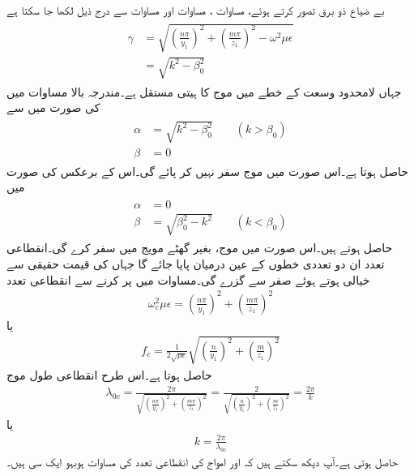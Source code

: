 بے ضیاع ذو برق  تصور کرتے ہوئے، مساوات ،  مساوات  اور مساوات  سے درج ذیل لکھا جا سکتا ہے
\begin{gather}
\begin{aligned}\label{مساوات_مویج_عرضی_مقناطیسی_مستقل_موج}
\gamma&=\sqrt{\left(\frac{n\pi}{y_1}\right)^2+\left(\frac{m\pi}{z_1}\right)^2-\omega^2 \mu \epsilon}\\
&=\sqrt{k^2-\beta_0^2}
\end{aligned}
\end{gather}
جہاں  لامحدود وسعت کے خطے میں موج کا ہیتی مستقل  ہے۔مندرجہ بالا مساوات میں  کی صورت میں  سے
\begin{gather}
\begin{aligned}\label{مساوات_مویج_تضعیفی_مستقل_الف}
\alpha&=\sqrt{k^2-\beta_0^2}  \quad \quad (k>\beta_0)\\
\beta &=0
\end{aligned}
\end{gather}
حاصل ہوتا ہے۔اس صورت میں موج سفر نہیں کر پائے گی۔اس کے برعکس  کی صورت میں
\begin{gather}
\begin{aligned}\label{مساوات_مویج_زاویائی_مستقل_الف}
\alpha&=0\\
\beta &= \sqrt{\beta_0^2-k^2}  \quad \quad (k<\beta_0)
\end{aligned}
\end{gather}
حاصل ہوتے ہیں۔اس صورت میں موج، بغیر گھٹے مویج میں سفر کرے گی۔انقطاعی تعدد ان دو تعددی خطوں کے عین درمیان پایا جائے گا جہاں  کی قیمت حقیقی سے خیالی ہوتے ہوئے صفر سے گزرے گی۔مساوات  میں  پر کرنے سے انقطاعی تعدد
\begin{align}
\omega_c^2 \mu \epsilon =\left(\frac{n\pi}{y_1}\right)^2+\left(\frac{m\pi}{z_1}\right)^2
\end{align}
یا
\begin{align}
f_c =\frac{1}{2 \sqrt{\mu \epsilon}}\sqrt{\left(\frac{n}{y_1}\right)^2+\left(\frac{m}{z_1}\right)^2}
\end{align}
حاصل ہوتا ہے۔اس طرح انقطاعی طول موج
\begin{align}\label{مساوات_مویج_مستطیلی_انقطاعی_طول}
\lambda_{0c}=\frac{2\pi}{\sqrt{\left(\frac{n\pi}{y_1}\right)^2+\left(\frac{m\pi}{z_1}\right)^2}}=\frac{2}{\sqrt{\left(\frac{n}{y_1}\right)^2+\left(\frac{m}{z_1}\right)^2}}=\frac{2\pi}{k}
\end{align}
یا
\begin{align}
k=\frac{2\pi}{\lambda_{0c}}
\end{align}
حاصل ہوتی ہے۔آپ دیکھ سکتے ہیں کہ  اور  امواج کی انقطاعی تعدد کی مساوات ہوبہو ایک سی  ہیں۔

